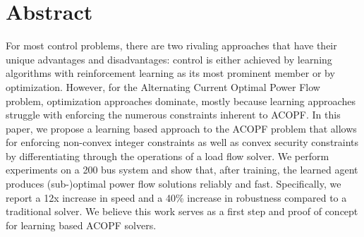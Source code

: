 

\section{Abstract}
For most control problems, there are two rivaling approaches that have their unique advantages and disadvantages: control is either achieved by learning algorithms with reinforcement learning as its most prominent member or by optimization. However, for the Alternating Current Optimal Power Flow problem, optimization approaches dominate, mostly because learning approaches struggle with enforcing the numerous constraints inherent to ACOPF. In this paper, we propose a learning based approach to the ACOPF problem that allows for enforcing non-convex integer constraints as well as convex security constraints by differentiating through the operations of a load flow solver. We perform experiments on a 200 bus system and show that, after training, the learned agent produces (sub-)optimal power flow solutions reliably and fast. Specifically, we report a 12x increase in speed and a 40\% increase in robustness compared to a traditional solver. We believe this work serves as a first step and proof of concept for learning based ACOPF solvers.

